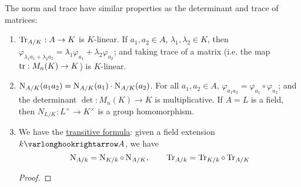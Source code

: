 \begin{remark}\label{rmk: props of norm and trace maps}
    The norm and trace have similar properties as the determinant and trace of matrices:
    \begin{enumerate}[label=\arabic*)]
        \item $\operatorname{Tr}_{A/K}: A \to K$ is $K$-linear. If $a_1, a_2 \in A$, $\lambda_1, \lambda_2 \in K$, then $\varphi_{\lambda_1 a_1 + \lambda_2 a_2} = \lambda_1 \varphi_{a_1} + \lambda_2 \varphi_{a_2}$; and taking trace of a matrix (i.e. the map $\operatorname{tr}: M_n(K) \to K$) is $K$-linear.
        \item $\operatorname{N}_{A/K}(a_1 a_2) = \operatorname{N}_{A/K}(a_1) \cdot \operatorname{N}_{A/K}(a_2)$. For all $a_1, a_2 \in A$, $\varphi_{a_1 a_2} = \varphi_{a_1} \circ \varphi_{a_2}$; and the determinant $\det: M_n(K) \to K$ is multiplicative. If $A = L$ is a field, then $N_{L/K}: L^{\times} \to K^{\times}$ is a group homomorphism.
        \item We have the \underline{transitive formula}: given a field extension $k \ext A$, we have
        \[
            \operatorname{N}_{A/k} = \operatorname{N}_{K/k} \circ \operatorname{N}_{A/K}, \qquad \operatorname{Tr}_{A/k} = \operatorname{Tr}_{K/k} \circ \operatorname{Tr}_{A/K}
        \]
        \begin{proof}
            

\end{proof}
\end{enumerate}
\end{remark}
